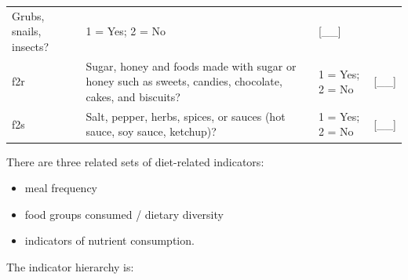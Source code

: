 \documentclass[12pt,a4paper]{book}
\providecommand{\tightlist}{%
  \setlength{\itemsep}{0pt}\setlength{\parskip}{0pt}}
\theoremstyle{definition}
\theoremstyle{definition}
\theoremstyle{definition}
\theoremstyle{remark}
\begin{document}
\begin{longtable}[]{@{}llll@{}}
\begin{minipage}[t]{0.41\columnwidth}
Grubs, snails, insects?\strut
\end{minipage} & \begin{minipage}[t]{0.25\columnwidth}\raggedright
1 = Yes; 2 = No\strut
\end{minipage} & \begin{minipage}[t]{0.13\columnwidth}\raggedright
{[}\_\_{]}\strut
\end{minipage}\tabularnewline
\begin{minipage}[t]{0.09\columnwidth}\raggedright
f2r\strut
\end{minipage} & \begin{minipage}[t]{0.41\columnwidth}\raggedright
Sugar, honey and foods made with sugar or honey such as sweets, candies,
chocolate, cakes, and biscuits?\strut
\end{minipage} & \begin{minipage}[t]{0.25\columnwidth}\raggedright
1 = Yes; 2 = No\strut
\end{minipage} & \begin{minipage}[t]{0.13\columnwidth}\raggedright
{[}\_\_{]}\strut
\end{minipage}\tabularnewline
\begin{minipage}[t]{0.09\columnwidth}\raggedright
f2s\strut
\end{minipage} & \begin{minipage}[t]{0.41\columnwidth}\raggedright
Salt, pepper, herbs, spices, or sauces (hot sauce, soy sauce,
ketchup)?\strut
\end{minipage} & \begin{minipage}[t]{0.25\columnwidth}\raggedright
1 = Yes; 2 = No\strut
\end{minipage} & \begin{minipage}[t]{0.13\columnwidth}\raggedright
{[}\_\_{]}\strut
\end{minipage}\tabularnewline
\bottomrule
\end{longtable}

There are three related sets of diet-related indicators:

\begin{itemize}
\tightlist
\item
  meal frequency
\item
  food groups consumed / dietary diversity
\item
  indicators of nutrient consumption.
\end{itemize}

The indicator hierarchy is:

\newpage
\end{document}
